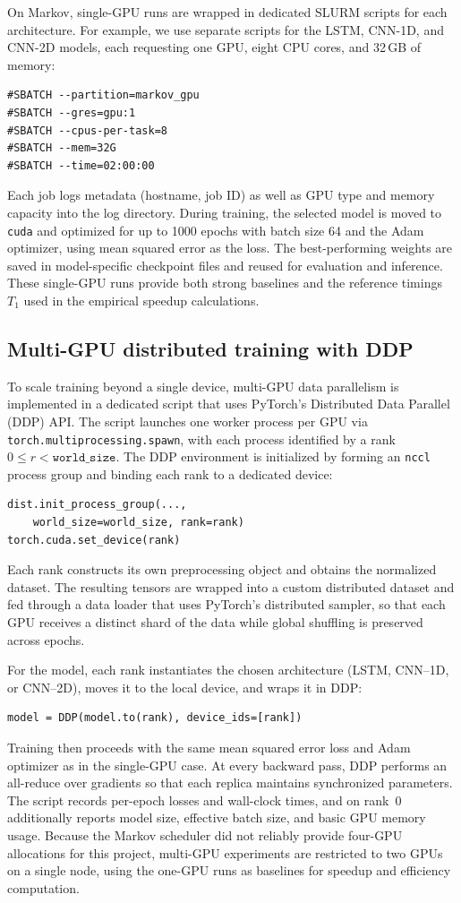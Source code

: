 \documentclass[sigconf]{acmart}
\begin{document}
On Markov, single-GPU runs are wrapped in dedicated SLURM scripts for each architecture. For example, we use separate scripts for the LSTM, CNN-1D, and CNN-2D models, each requesting one GPU, eight CPU cores, and 32\,GB of memory:
\begin{verbatim}
#SBATCH --partition=markov_gpu
#SBATCH --gres=gpu:1
#SBATCH --cpus-per-task=8
#SBATCH --mem=32G
#SBATCH --time=02:00:00
\end{verbatim}
Each job logs metadata (hostname, job ID) as well as GPU type and memory capacity into the log directory. During training, the selected model is moved to \texttt{cuda} and optimized for up to 1000 epochs with batch size 64 and the Adam optimizer, using mean squared error as the loss. The best-performing weights are saved in model-specific checkpoint files and reused for evaluation and inference. These single-GPU runs provide both strong baselines and the reference timings \(T_1\) used in the empirical speedup calculations.

\subsection{Multi-GPU distributed training with DDP}

To scale training beyond a single device, multi-GPU data parallelism is implemented in a dedicated script that uses PyTorch's Distributed Data Parallel (DDP) API. The script launches one worker process per GPU via \texttt{torch.multiprocessing.spawn}, with each process identified by a rank \(0 \le r < \texttt{world\_size}\). The DDP environment is initialized by forming an \texttt{nccl} process group and binding each rank to a dedicated device:
\begin{verbatim}
dist.init_process_group(..., 
    world_size=world_size, rank=rank)
torch.cuda.set_device(rank)
\end{verbatim}
Each rank constructs its own preprocessing object and obtains the normalized dataset. The resulting tensors are wrapped into a custom distributed dataset and fed through a data loader that uses PyTorch's distributed sampler, so that each GPU receives a distinct shard of the data while global shuffling is preserved across epochs.

For the model, each rank instantiates the chosen architecture (LSTM, CNN--1D, or CNN--2D), moves it to the local device, and wraps it in DDP:
\begin{verbatim}
model = DDP(model.to(rank), device_ids=[rank])
\end{verbatim}
Training then proceeds with the same mean squared error loss and Adam optimizer as in the single-GPU case. At every backward pass, DDP performs an all-reduce over gradients so that each replica maintains synchronized parameters. The script records per-epoch losses and wall-clock times, and on rank~0 additionally reports model size, effective batch size, and basic GPU memory usage. Because the Markov scheduler did not reliably provide four-GPU allocations for this project, multi-GPU experiments are restricted to two GPUs on a single node, using the one-GPU runs as baselines for speedup and efficiency computation.
\end{document}
